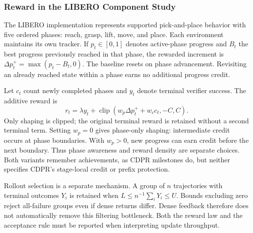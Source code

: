\subsubsection{Reward in the LIBERO Component Study}\label{sec:dense_method}
The LIBERO implementation represents supported pick-and-place behavior with five ordered phases: reach, grasp, lift, move, and place. Each environment maintains its own tracker. If $p_t\in[0,1]$ denotes active-phase progress and $B_t$ the best progress previously reached in that phase, the rewarded increment is $\Delta p_t^+=\max(p_t-B_t,0)$. The baseline resets on phase advancement. Revisiting an already reached state within a phase earns no additional progress credit.

Let $c_t$ count newly completed phases and $y_t$ denote terminal verifier success. The additive reward is
\begin{equation}
r_t=\lambda y_t+\operatorname{clip}(w_p\Delta p_t^++w_c c_t,-C,C).
\label{eq:dense}
\end{equation}
Only shaping is clipped; the original terminal reward is retained without a second terminal term. Setting $w_p=0$ gives phase-only shaping: intermediate credit occurs at phase boundaries. With $w_p>0$, new progress can earn credit before the next boundary. Thus phase awareness and reward density are separate choices. Both variants remember achievements, as CDPR milestones do, but neither specifies CDPR's stage-local credit or prefix protection. 

Rollout selection is a separate mechanism. A group of $n$ trajectories with terminal outcomes $Y_i$ is retained when $L\le n^{-1}\sum_iY_i\le U$. Bounds excluding zero reject all-failure groups even if dense returns differ. Dense feedback therefore does not automatically remove this filtering bottleneck. Both the reward law and the acceptance rule must be reported when interpreting update throughput.
